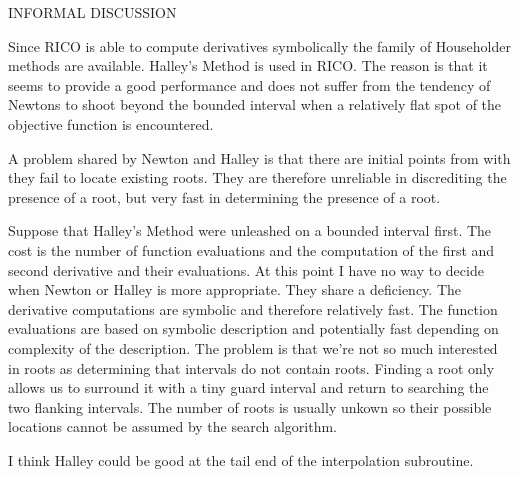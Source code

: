 INFORMAL DISCUSSION

Since RICO is able to compute derivatives symbolically the family of Householder methods are available. 
Halley's Method is used in RICO. The reason is that it seems to provide a good performance and does not suffer from the tendency of Newtons to shoot beyond the bounded interval when a relatively flat spot of the objective function is encountered.

A problem shared by Newton and Halley is that there are initial points from with they fail to locate existing roots. They are therefore unreliable in discrediting the presence of a root, but very fast in determining the presence of a root.

Suppose that Halley's Method were unleashed on a bounded interval first. The cost is the number of function evaluations and the computation of the first and second derivative and their evaluations. At this point I have no way to decide when Newton or Halley is more appropriate. They share a deficiency. The derivative computations are symbolic and therefore relatively fast. The function evaluations are based on symbolic description and potentially fast depending on complexity of the description. The problem is that we're not so much interested in roots as determining that intervals do not contain roots. Finding a root only allows us to surround it with a tiny guard interval and return to searching the two flanking intervals. The number of roots is usually unkown so their possible locations cannot be assumed by the search algorithm.

I think Halley could be good at the tail end of the interpolation subroutine. 
